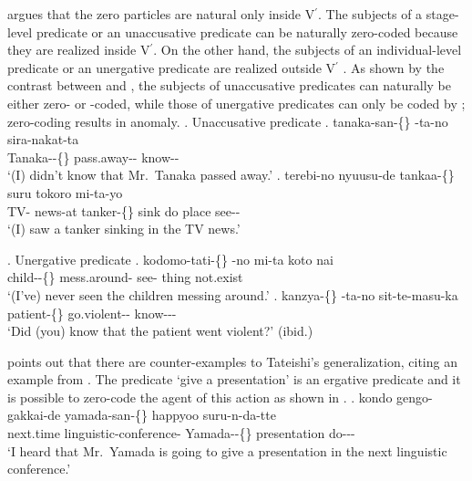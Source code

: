 argues that the zero particles are natural only inside V$^{\prime}$.
The subjects of a stage-level predicate or an unaccusative predicate can be naturally zero-coded
because they are realized inside V$^{\prime}$.
On the other hand, the subjects of an individual-level predicate or an unergative predicate
are realized outside V$^{\prime}$ \cite[see also][56--57]{kageyama93}.
As shown by the contrast between \Next and \NNext,
the subjects of unaccusative predicates \Next can naturally be either zero- or -coded,
while those of unergative predicates \NNext can only be coded by ;
zero-coding results in anomaly.
%
\ex. Unaccusative predicate
 \ag. tanaka-san-\{\} -ta-no sira-nakat-ta \\
      Tanaka--\{\} pass.away-- know-- \\
      `(I) didn't know that Mr.~Tanaka passed away.'
 \bg. terebi-no nyuusu-de tankaa-\{\}  suru tokoro mi-ta-yo \\
      TV- news-at tanker-\{\} sink do place see-- \\
      `(I) saw a tanker sinking in the TV news.'
      \hfill{\cite[56]{kageyama93}}

\ex. Unergative predicate
 \ag. kodomo-tati-\{\} -no mi-ta koto nai \\
      child--\{\} mess.around- see- thing not.exist \\
      `(I've) never seen the children messing around.'
 \bg. kanzya-\{\} -ta-no sit-te-masu-ka \\
      patient-\{\} go.violent-- know--- \\
      `Did (you) know that the patient went violent?'
      \hfill{(ibid.)}


 points out that there are counter-examples to Tateishi's generalization,
citing an example from .
The predicate  `give a presentation' is an ergative predicate and it is possible to zero-code the agent of this action
as shown in \Next.
%
\exg. kondo gengo-gakkai-de yamada-san-\{\} happyoo suru-n-da-tte \\
      next.time linguistic-conference- Yamada--\{\} presentation do--- \\
      `I heard that Mr.~Yamada is going to give a presentation in the next linguistic conference.'
      \hfill{\cite[49]{niwa89}}

